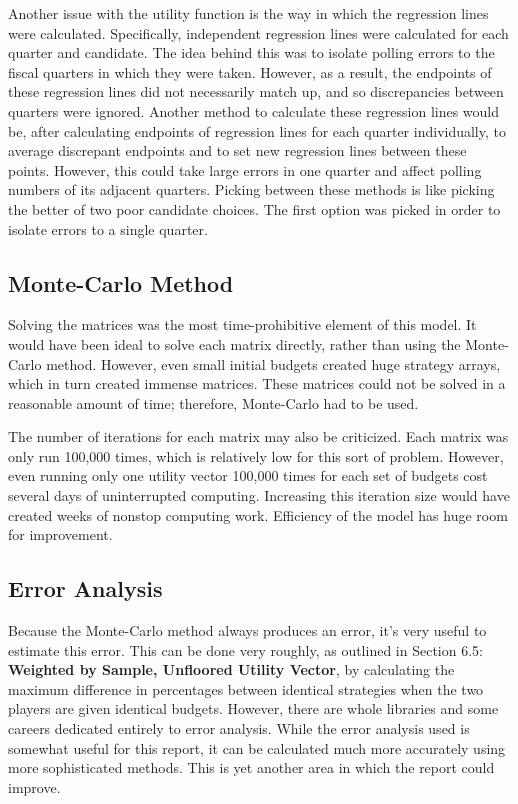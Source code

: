\documentclass[11pt]{article}
\begin{document}
Another issue with the utility function is the way in which the regression
lines were calculated. Specifically, independent regression lines were
calculated for each quarter and candidate. The idea behind this was to
isolate polling errors to the fiscal quarters in which they were
taken. However, as a result, the endpoints of these regression lines did
not necessarily match up, and so discrepancies between quarters were
ignored. Another method to calculate these regression lines would be, after
calculating endpoints of regression lines for each quarter individually, to
average discrepant endpoints and to set new regression lines between these
points. However, this could take large errors in one quarter and affect
polling numbers of its adjacent quarters. Picking between these methods is
like picking the better of two poor candidate choices. The first option was
picked in order to isolate errors to a single quarter.

\subsection{Monte-Carlo Method}
Solving the matrices was the most time-prohibitive element of this
model. It would have been ideal to solve each matrix directly, rather than
using the Monte-Carlo method. However, even small initial budgets created
huge strategy arrays, which in turn created immense matrices. These
matrices could not be solved in a reasonable amount of time; therefore,
Monte-Carlo had to be used.

The number of iterations for each matrix may also be criticized. Each
matrix was only run 100,000 times, which is relatively low for this sort of
problem. However, even running only one utility vector 100,000 times for
each set of budgets cost several days of uninterrupted
computing. Increasing this iteration size would have created weeks of
nonstop computing work. Efficiency of the model has huge room for
improvement.

\subsection{Error Analysis}
Because the Monte-Carlo method always produces an error, it's very useful to estimate this error. This can be done very roughly, as outlined in Section 6.5: \textbf{Weighted by Sample, Unfloored Utility Vector}, by calculating the maximum difference in percentages between identical strategies when the two players are given identical budgets. However, there are whole libraries and some careers dedicated entirely to error analysis. While the error analysis used is somewhat useful for this report, it can be calculated much more accurately using more sophisticated methods. This is yet another area in which the report could improve. 
\end{document}

